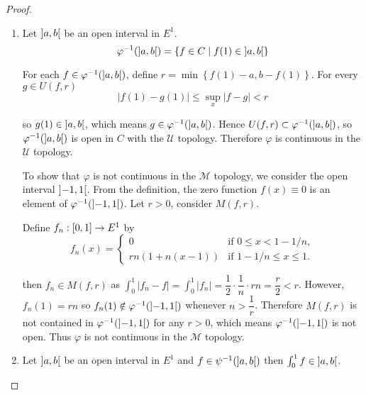 \begin{proof}
	\begin{enumerate}[label={(\alph*)}]
		\item Let \( \left\rbrack{a,b}\right\lbrack \) be an open interval in \( E^{1} \).
		      \[
			      \varphi^{-1}(\left\rbrack{a,b}\right\lbrack) = \left\{ f \in C \mid f(1) \in \left\rbrack{a,b}\right\lbrack \right\}
		      \]

		      For each \( f \in \varphi^{-1}(\left\rbrack{a, b}\right\lbrack) \), define \( r = \min\left\{ f(1) - a, b - f(1) \right\} \). For every \( g \in U(f, r) \)
		      \[
			      \left\vert f(1) - g(1) \right\vert \le \sup_{x} \left\vert f - g \right\vert < r
		      \]

		      so \( g(1) \in \left\rbrack{a,b}\right\lbrack \), which means \( g \in \varphi^{-1}(\left\rbrack{a, b}\right\lbrack) \). Hence \( U(f, r) \subset \varphi^{-1}(\left\rbrack{a, b}\right\lbrack) \), so \( \varphi^{-1}(\left\rbrack{a, b}\right\lbrack) \) is open in \( C \) with the \(\mathscr{U}\) topology. Therefore \( \varphi \) is continuous in the \(\mathscr{U}\) topology.

		      To show that \( \varphi \) is not continuous in the \(\mathscr{M}\) topology, we consider the open interval \( \left\rbrack{-1, 1}\right\lbrack \). From the definition, the zero function \( f(x) \equiv 0 \) is an element of \( \varphi^{-1}(\left\rbrack{-1, 1}\right\lbrack) \). Let \( r > 0 \), consider \( M(f, r) \).

		      Define \( f_{n}: \left\lbrack{0,1}\right\rbrack \to E^{1} \) by
		      \[
			      f_{n}(x) = \begin{cases}
				      0                & \text{if } 0 \le x < 1 - 1/n,   \\
				      rn(1 + n(x - 1)) & \text{if } 1 - 1/n \le x \le 1.
			      \end{cases}
		      \]

		      then \( f_{n} \in M(f, r) \) as \( \int_{0}^{1} \left\vert f_{n} - f \right\vert = \int_{0}^{1} \left\vert f_{n} \right\vert = \dfrac{1}{2}\cdot\dfrac{1}{n}\cdot rn = \dfrac{r}{2} < r \). However, \( f_{n}(1) = rn \) so \( f_{n}(1) \notin \varphi^{-1}(\left\rbrack{-1, 1}\right\lbrack) \) whenever \( n > \dfrac{1}{r} \). Therefore \( M(f, r) \) is not contained in \( \varphi^{-1}(\left\rbrack{-1, 1}\right\lbrack) \) for any \( r > 0 \), which means \( \varphi^{-1}(\left\rbrack{-1, 1}\right\lbrack) \) is not open. Thus \( \varphi \) is not continuous in the \( \mathscr{M} \) topology.
		\item Let \( \left\rbrack{a,b}\right\lbrack \) be an open interval in \( E^{1} \) and \( f \in \psi^{-1}(\left\rbrack{a,b}\right\lbrack) \) then \( \int_{0}^{1} f \in \left\rbrack{a,b}\right\lbrack \).


\end{enumerate}
\end{proof}
